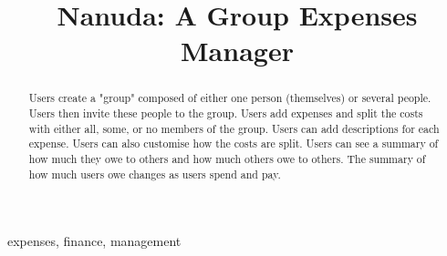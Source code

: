 \documentclass[conference]{IEEEtran}
\begin{document}
\title{Nanuda: A Group Expenses Manager}

\author{
\and
{}
\and
{}
}

\maketitle

\begin{abstract}
Users create a "group" composed of either one person (themselves) or several people. Users then invite these people to the group. Users add expenses and split the costs with either all, some, or no members of the group. Users can add descriptions for each expense. Users can also customise how the costs are split. Users can see a summary of how much they owe to others and how much others owe to others. The summary of how much users owe changes as users spend and pay.
\end{abstract}

\begin{IEEEkeywords}
expenses, finance, management
\end{IEEEkeywords}
\end{document}
